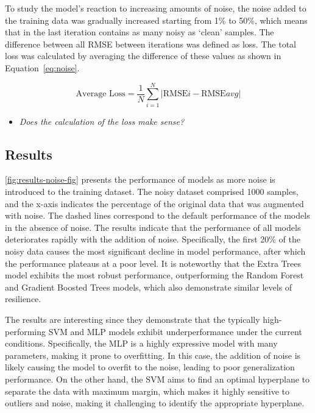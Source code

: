 To study the model's reaction to increasing amounts of noise, the noise added
to the training data was gradually increased starting from 1\% to 50\%, which means that in the
last iteration contains as many noisy as `clean' samples.
The difference between all \ac{RMSE} between iterations was defined as loss.
The total loss was calculated by averaging the difference of these values as shown in Equation~\ref{eq:noise}.

\begin{tcolorbox}[arc=0pt,boxrule=0.5pt]
    \begin{equation}
        \text{Average Loss} = \frac{1}{N} \sum_{i=1}^{N} |\text{RMSE}i -
        \text{RMSE}{avg}|\label
        {eq:noise}
    \end{equation}
\end{tcolorbox}

\begin{itemize}
    \item \textit{Does the calculation of the loss make sense?}
\end{itemize}

\subsection{Results}\label{subsec:results-robustness}
\cref{fig:results-noise-fig} presents the performance of models as more noise is introduced to the training
dataset.
The noisy dataset comprised 1000 samples, and the x-axis indicates the percentage of the original data that
was augmented with noise.
The dashed lines correspond to the default performance of the models in the absence of noise.
The results indicate that the performance of all models deteriorates rapidly with the addition of noise.
Specifically, the first 20\% of the noisy data causes the most significant decline in model performance, after which the
performance plateaus at a poor level.
It is noteworthy that the Extra Trees model exhibits the most robust performance, outperforming the Random Forest
and Gradient Boosted Trees models, which also demonstrate similar levels of resilience.

The results are interesting since they demonstrate that the typically high-performing SVM and MLP models
exhibit underperformance under the current conditions.
Specifically, the MLP is a highly expressive model with many parameters, making it prone to overfitting.
In this case, the addition of noise is likely causing the model to overfit to the noise, leading to poor
generalization performance.
On the other hand, the SVM aims to find an optimal hyperplane to separate the data with maximum margin, which makes
it highly sensitive to outliers and noise, making it challenging to identify the appropriate hyperplane.

